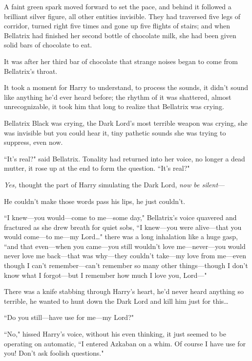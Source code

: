 
\lettrine{A}{} faint green spark moved forward to set the pace, and behind it followed a brilliant silver figure, all other entities invisible. They had traversed five legs of corridor, turned right five times and gone up five flights of stairs; and when Bellatrix had finished her second bottle of chocolate milk, she had been given solid bars of chocolate to eat.

It was after her third bar of chocolate that strange noises began to come from Bellatrix's throat.

It took a moment for Harry to understand, to process the sounds, it didn't sound like anything he'd ever heard before; the rhythm of it was shattered, almost unrecognizable, it took him that long to realize that Bellatrix was crying.

Bellatrix Black was crying, the Dark Lord's most terrible weapon was crying, she was invisible but you could hear it, tiny pathetic sounds she was trying to suppress, even now.

``It's real?" said Bellatrix. Tonality had returned into her voice, no longer a dead mutter, it rose up at the end to form the question. ``It's real?"

\emph{Yes,} thought the part of Harry simulating the Dark Lord, \emph{now be silent}—

He couldn't make those words pass his lips, he just couldn't.

``I knew—you would—come to me—some day," Bellatrix's voice quavered and fractured as she drew breath for quiet sobs, ``I knew—you were alive—that you would come—to me—my Lord{\ldots}" there was a long inhalation like a huge gasp, ``and that even—when you came—you still wouldn't love me—never—you would never love me back—that was why—they couldn't take—my love from me—even though I can't remember—can't remember so many other things—though I don't know what I forgot—but I remember how much I love you, Lord—"

There was a knife stabbing through Harry's heart, he'd never heard anything so terrible, he wanted to hunt down the Dark Lord and kill him just for this{\ldots}

``Do you still—have use for me—my Lord?"

``No," hissed Harry's voice, without his even thinking, it just seemed to be operating on automatic, ``I entered Azkaban on a whim. Of course I have use for you! Don't ask foolish questions."

